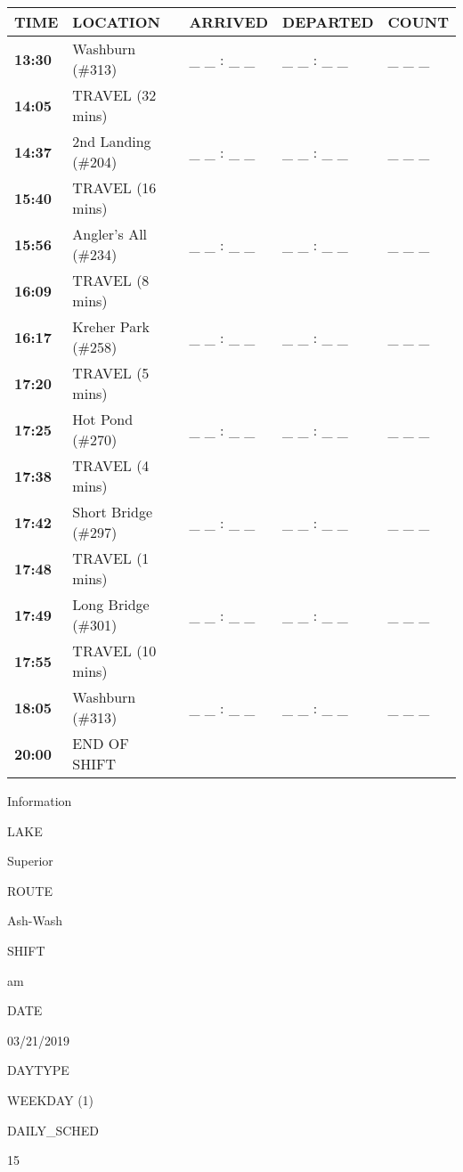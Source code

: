 \documentclass[]{article}
\begin{document}
\begin{tabular}{>{\bfseries}lllll}
\toprule
\textbf{TIME} & \textbf{LOCATION} & \textbf{ARRIVED} & \textbf{DEPARTED} & \textbf{COUNT}\\
\midrule
13:30 & Washburn (\#313) & \_ \_ : \_ \_ & \_ \_ : \_ \_ & \_ \_ \_\\
14:05 & TRAVEL (32 mins) &  &  & \\
14:37 & 2nd Landing (\#204) & \_ \_ : \_ \_ & \_ \_ : \_ \_ & \_ \_ \_\\
15:40 & TRAVEL (16 mins) &  &  & \\
15:56 & Angler's All (\#234) & \_ \_ : \_ \_ & \_ \_ : \_ \_ & \_ \_ \_\\
16:09 & TRAVEL (8 mins) &  &  & \\
16:17 & Kreher Park (\#258) & \_ \_ : \_ \_ & \_ \_ : \_ \_ & \_ \_ \_\\
17:20 & TRAVEL (5 mins) &  &  & \\
17:25 & Hot Pond (\#270) & \_ \_ : \_ \_ & \_ \_ : \_ \_ & \_ \_ \_\\
17:38 & TRAVEL (4 mins) &  &  & \\
17:42 & Short Bridge (\#297) & \_ \_ : \_ \_ & \_ \_ : \_ \_ & \_ \_ \_\\
17:48 & TRAVEL (1 mins) &  &  & \\
17:49 & Long Bridge (\#301) & \_ \_ : \_ \_ & \_ \_ : \_ \_ & \_ \_ \_\\
17:55 & TRAVEL (10 mins) &  &  & \\
18:05 & Washburn (\#313) & \_ \_ : \_ \_ & \_ \_ : \_ \_ & \_ \_ \_\\
20:00 & END OF SHIFT &  &  & \\
\bottomrule
\end{tabular}\newpage

Information

LAKE

Superior

ROUTE

Ash-Wash

SHIFT

am

DATE

03/21/2019

DAYTYPE

WEEKDAY (1)

DAILY\_SCHED

15

\vspace{24pt}
\end{document}

